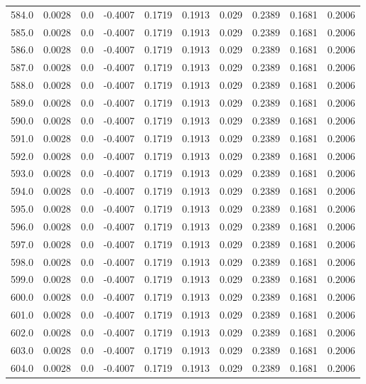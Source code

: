 \begin{longtable}{lrrrrrrrrr}
584.0 & 0.0028 & 0.0 & -0.4007 & 0.1719 & 0.1913 & 0.029 & 0.2389 & 0.1681 & 0.2006 \\
585.0 & 0.0028 & 0.0 & -0.4007 & 0.1719 & 0.1913 & 0.029 & 0.2389 & 0.1681 & 0.2006 \\
586.0 & 0.0028 & 0.0 & -0.4007 & 0.1719 & 0.1913 & 0.029 & 0.2389 & 0.1681 & 0.2006 \\
587.0 & 0.0028 & 0.0 & -0.4007 & 0.1719 & 0.1913 & 0.029 & 0.2389 & 0.1681 & 0.2006 \\
588.0 & 0.0028 & 0.0 & -0.4007 & 0.1719 & 0.1913 & 0.029 & 0.2389 & 0.1681 & 0.2006 \\
589.0 & 0.0028 & 0.0 & -0.4007 & 0.1719 & 0.1913 & 0.029 & 0.2389 & 0.1681 & 0.2006 \\
590.0 & 0.0028 & 0.0 & -0.4007 & 0.1719 & 0.1913 & 0.029 & 0.2389 & 0.1681 & 0.2006 \\
591.0 & 0.0028 & 0.0 & -0.4007 & 0.1719 & 0.1913 & 0.029 & 0.2389 & 0.1681 & 0.2006 \\
592.0 & 0.0028 & 0.0 & -0.4007 & 0.1719 & 0.1913 & 0.029 & 0.2389 & 0.1681 & 0.2006 \\
593.0 & 0.0028 & 0.0 & -0.4007 & 0.1719 & 0.1913 & 0.029 & 0.2389 & 0.1681 & 0.2006 \\
594.0 & 0.0028 & 0.0 & -0.4007 & 0.1719 & 0.1913 & 0.029 & 0.2389 & 0.1681 & 0.2006 \\
595.0 & 0.0028 & 0.0 & -0.4007 & 0.1719 & 0.1913 & 0.029 & 0.2389 & 0.1681 & 0.2006 \\
596.0 & 0.0028 & 0.0 & -0.4007 & 0.1719 & 0.1913 & 0.029 & 0.2389 & 0.1681 & 0.2006 \\
597.0 & 0.0028 & 0.0 & -0.4007 & 0.1719 & 0.1913 & 0.029 & 0.2389 & 0.1681 & 0.2006 \\
598.0 & 0.0028 & 0.0 & -0.4007 & 0.1719 & 0.1913 & 0.029 & 0.2389 & 0.1681 & 0.2006 \\
599.0 & 0.0028 & 0.0 & -0.4007 & 0.1719 & 0.1913 & 0.029 & 0.2389 & 0.1681 & 0.2006 \\
600.0 & 0.0028 & 0.0 & -0.4007 & 0.1719 & 0.1913 & 0.029 & 0.2389 & 0.1681 & 0.2006 \\
601.0 & 0.0028 & 0.0 & -0.4007 & 0.1719 & 0.1913 & 0.029 & 0.2389 & 0.1681 & 0.2006 \\
602.0 & 0.0028 & 0.0 & -0.4007 & 0.1719 & 0.1913 & 0.029 & 0.2389 & 0.1681 & 0.2006 \\
603.0 & 0.0028 & 0.0 & -0.4007 & 0.1719 & 0.1913 & 0.029 & 0.2389 & 0.1681 & 0.2006 \\
604.0 & 0.0028 & 0.0 & -0.4007 & 0.1719 & 0.1913 & 0.029 & 0.2389 & 0.1681 & 0.2006 \\

\end{longtable}
